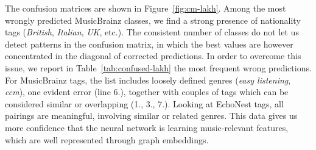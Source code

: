 \documentclass{article}
\newcommand{\tabref}[1]{\mbox{Table~\ref{#1}}}
\newcommand{\figref}[1]{\mbox{Figure~\ref{#1}}}
\begin{document}
The confusion matrices are shown in \figref{fig:cm-lakh}. Among the most wrongly predicted MusicBrainz classes, we find a strong presence of nationality tags (\textit{British}, \textit{Italian}, \textit{UK}, etc.).
The consistent number of classes do not let us detect patterns in the confusion matrix, in which the best values are however concentrated in the diagonal of corrected predictions.
In order to overcome this issue, we report in \tabref{tab:confused-lakh} the most frequent wrong predictions. For MusicBrainz tags, the list includes loosely defined genres (\textit{easy listening}, \textit{ccm}), one evident error (line 6.), together with couples of tags which can be considered similar or overlapping (1., 3., 7.). Looking at EchoNest tags, all pairings are meaningful, involving similar or related genres. This data gives us more confidence that the neural network is learning music-relevant features, which are well represented through graph embeddings.

\begin{table}[ht]
\caption{Most frequent prediction errors for tag classification, with the percentage of cases over the total of the class}
\label{tab:confused-lakh}
\end{table}
\end{document}

